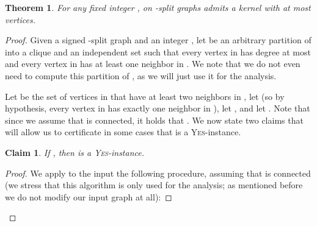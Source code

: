 \documentclass[
final
]{dmtcs-episciences}
\newtheorem{theorem}{Theorem}{\bfseries}{\itshape}
\newtheorem{claimN}{Claim}{\bfseries}{\itshape}
\begin{document}
\begin{theorem}
\label{thm:linear-d-split} For any fixed integer , {} on -split graphs admits a kernel with at most  vertices.
\end{theorem}
\begin{proof} Given a signed -split graph  and an integer , let  be an arbitrary partition of  into a clique  and an independent set  such that every vertex in  has degree at most  and every vertex in  has at least one neighbor in . We note that we do not even need to compute this partition  of , as we will just use it for the analysis.

Let  be the set of vertices in  that have at least two neighbors in , let  (so by hypothesis, every vertex in  has exactly one neighbor in ), let , and let . Note that since we assume that  is connected, it holds that . We now state two claims that will allow us to certificate in some cases that  is a \textsc{Yes}-instance.









\begin{claimN}\label{claim:clique}
If , then  is a \textsc{Yes}-instance.
\end{claimN}

\begin{proof} We apply to the input  the following procedure, assuming that  is connected (we stress that this algorithm is only used for the analysis; as mentioned before we do not modify our input graph at all):


\end{proof}
\end{proof}
\end{document}
